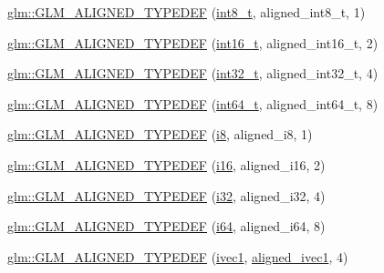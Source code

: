 \begin{DoxyCompactItemize}
\item 
\hyperlink{group__gtx__type__aligned_ga848aedf13e2d9738acf0bb482c590174}{glm\+::\+G\+L\+M\+\_\+\+A\+L\+I\+G\+N\+E\+D\+\_\+\+T\+Y\+P\+E\+D\+EF} (\hyperlink{group__gtc__type__precision_ga673898d450b2a91186f3c4f40c5f8633}{int8\+\_\+t}, aligned\+\_\+int8\+\_\+t, 1)
\item 
\hyperlink{group__gtx__type__aligned_gafd2803d39049dd45a37a63931e25d943}{glm\+::\+G\+L\+M\+\_\+\+A\+L\+I\+G\+N\+E\+D\+\_\+\+T\+Y\+P\+E\+D\+EF} (\hyperlink{group__gtc__type__precision_gaf89ee61e0d34aa4a462104b7ae7f2da6}{int16\+\_\+t}, aligned\+\_\+int16\+\_\+t, 2)
\item 
\hyperlink{group__gtx__type__aligned_gae553b33349d6da832cf0724f1e024094}{glm\+::\+G\+L\+M\+\_\+\+A\+L\+I\+G\+N\+E\+D\+\_\+\+T\+Y\+P\+E\+D\+EF} (\hyperlink{group__gtc__type__precision_gab870c0eb6f525b0c8c4716762e0fc3a8}{int32\+\_\+t}, aligned\+\_\+int32\+\_\+t, 4)
\item 
\hyperlink{group__gtx__type__aligned_ga16d223a2b3409e812e1d3bd87f0e9e5c}{glm\+::\+G\+L\+M\+\_\+\+A\+L\+I\+G\+N\+E\+D\+\_\+\+T\+Y\+P\+E\+D\+EF} (\hyperlink{group__gtc__type__precision_ga6abb23fbf4e39c50ec5341160b5da5ab}{int64\+\_\+t}, aligned\+\_\+int64\+\_\+t, 8)
\item 
\hyperlink{group__gtx__type__aligned_ga2de065d2ddfdb366bcd0febca79ae2ad}{glm\+::\+G\+L\+M\+\_\+\+A\+L\+I\+G\+N\+E\+D\+\_\+\+T\+Y\+P\+E\+D\+EF} (\hyperlink{group__gtc__type__precision_gaae064be68b7d36cd7910c16e8ad18bba}{i8}, aligned\+\_\+i8, 1)
\item 
\hyperlink{group__gtx__type__aligned_gabd786bdc20a11c8cb05c92c8212e28d3}{glm\+::\+G\+L\+M\+\_\+\+A\+L\+I\+G\+N\+E\+D\+\_\+\+T\+Y\+P\+E\+D\+EF} (\hyperlink{group__gtc__type__precision_ga35e5542ca05b29cc256fdafb8503d1fd}{i16}, aligned\+\_\+i16, 2)
\item 
\hyperlink{group__gtx__type__aligned_gad4aefe56691cdb640c72f0d46d3fb532}{glm\+::\+G\+L\+M\+\_\+\+A\+L\+I\+G\+N\+E\+D\+\_\+\+T\+Y\+P\+E\+D\+EF} (\hyperlink{group__gtc__type__precision_ga1d8ed5c43e91ea7d4528389da4fa9524}{i32}, aligned\+\_\+i32, 4)
\item 
\hyperlink{group__gtx__type__aligned_ga8fe9745f7de24a8394518152ff9fccdc}{glm\+::\+G\+L\+M\+\_\+\+A\+L\+I\+G\+N\+E\+D\+\_\+\+T\+Y\+P\+E\+D\+EF} (\hyperlink{group__gtc__type__precision_gac7a7eaad46064fc952b06df33689da23}{i64}, aligned\+\_\+i64, 8)
\item 
\hyperlink{group__gtx__type__aligned_gaaad735483450099f7f882d4e3a3569bd}{glm\+::\+G\+L\+M\+\_\+\+A\+L\+I\+G\+N\+E\+D\+\_\+\+T\+Y\+P\+E\+D\+EF} (\hyperlink{vec1_8hpp_a946031cea0c22745848ebd873e6facb0}{ivec1}, \hyperlink{group__gtc__type__aligned_gafe9657c41fa58e912f99e92284d79fce}{aligned\+\_\+ivec1}, 4)

\end{DoxyCompactItemize}
